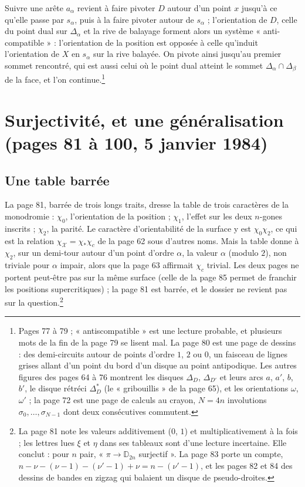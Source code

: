 \documentclass[11pt,a4paper]{article}
\begin{document}
Suivre une arête $a_\alpha$ revient à faire pivoter $D$ autour d'un point $x$
jusqu'à ce qu'elle passe par $s_\alpha$, puis à la faire pivoter autour de
$s_\alpha$ ; l'orientation de $D$, celle du point dual sur $\Delta_\alpha$ et la
rive de balayage forment alors un système « anti-compatible » : l'orientation
de la position est opposée à celle qu'induit l'orientation de $X$ en $s_\alpha$
sur la rive balayée. On pivote ainsi jusqu'au premier sommet rencontré, qui est
aussi celui où le point dual atteint le sommet $\Delta_\alpha \cap \Delta_\beta$
de la face, et l'on continue.\footnote{Pages 77 à 79 ; « antiscompatible » est
une lecture probable, et plusieurs mots de la fin de la page 79 se lisent mal.
La page 80 est une page de dessins : des demi-circuits autour de points d'ordre
$1$, $2$ ou $0$, un faisceau de lignes grises allant d'un point du bord d'un
disque au point antipodique. Les autres figures des pages 64 à 76 montrent les
disques $\Delta_D$, $\Delta_{D'}$ et leurs arcs $a$, $a'$, $b$, $b'$, le disque
rétréci $\Delta^{*}_D$ (le « gribouillis » de la page 65), et les orientations
$\omega$, $\omega'$ ; la page 72 est une page de calculs au crayon, $N = 4n$
involutions $\sigma_0, \ldots, \sigma_{N-1}$ dont deux consécutives
commutent.}

\section*{Surjectivité, et une généralisation (pages 81 à 100, 5 janvier 1984)}

\subsection*{Une table barrée}

La page 81, barrée de trois longs traits, dresse la table de trois caractères
de la monodromie : $\chi_0$, l'orientation de la position ; $\chi_1$, l'effet
sur les deux $n$-gones inscrits ; $\chi_2$, la parité. Le caractère
d'orientabilité de la surface y est $\chi_0\chi_2$, ce qui est la relation
$\chi_{\mathcal{X}} = \chi_{\ast}\chi_c$ de la page 62 sous d'autres noms. Mais
la table donne à $\chi_2$, sur un demi-tour autour d'un point d'ordre $\alpha$,
la valeur $\alpha$ (modulo $2$), non triviale pour $\alpha$ impair, alors que la
page 63 affirmait $\chi_c$ trivial. Les deux pages ne portent peut-être pas sur
la même surface (celle de la page 85 permet de franchir les positions
supercritiques) ; la page 81 est barrée, et le dossier ne revient pas sur la
question.\footnote{La page 81 note les valeurs additivement ($0$, $1$) et
multiplicativement à la fois ; les lettres lues $\xi$ et $\eta$ dans ses
tableaux sont d'une lecture incertaine. Elle conclut : pour $n$ pair,
« $\pi \to \mathbb{D}_{2n}$ surjectif ». La page 83 porte un compte, $n - \nu -
(\nu - 1) - (\nu' - 1) + \nu = n - (\nu' - 1)$, et les pages 82 et 84 des
dessins de bandes en zigzag qui balaient un disque de pseudo-droites.}
\end{document}
